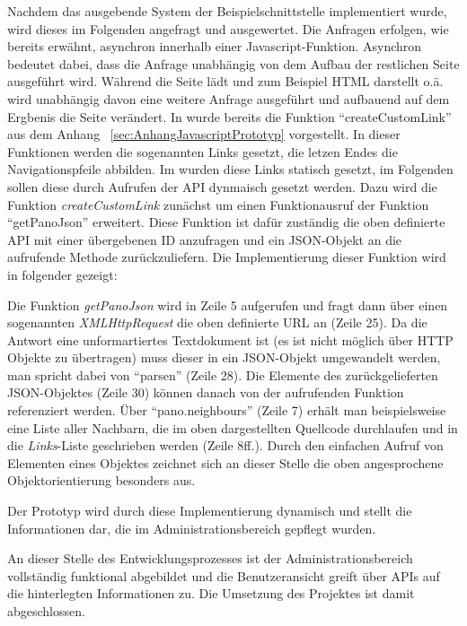 Nachdem das ausgebende System der Beispielschnittstelle implementiert wurde, wird dieses im Folgenden angefragt und ausgewertet. Die Anfragen erfolgen, wie bereits erwähnt, asynchron innerhalb einer Javascript-Funktion. Asynchron bedeutet dabei, dass die Anfrage unabhängig von dem Aufbau der restlichen Seite ausgeführt wird. Während die Seite lädt und zum Beispiel HTML darstellt o.ä. wird unabhängig davon eine weitere Anfrage ausgeführt und aufbauend auf dem Ergbenis die Seite verändert.
In  wurde bereits die Funktion "`createCustomLink"' aus dem Anhang ~\ref{sec:AnhangJavascriptPrototyp} vorgestellt. In dieser Funktionen werden die sogenannten Links gesetzt, die letzen Endes die Navigationspfeile abbilden. Im  wurden diese Links statisch gesetzt, im Folgenden sollen diese durch Aufrufen der API dynmaisch gesetzt werden. Dazu wird die Funktion \textit{createCustomLink} zunächst um einen Funktionausruf der Funktion "`getPanoJson"' erweitert. Diese Funktion ist dafür zuständig die oben definierte API mit einer übergebenen ID anzufragen und ein JSON-Objekt an die aufrufende Methode zurückzuliefern. Die Implementierung dieser Funktion wird in folgender  gezeigt:



Die Funktion \textit{getPanoJson} wird in Zeile 5 aufgerufen und fragt dann über einen sogenannten \textit{XMLHttpRequest} die oben definierte URL an (Zeile 25). Da die Antwort eine unformartiertes Textdokument ist (es ist nicht möglich über HTTP Objekte zu übertragen) muss dieser in ein JSON-Objekt umgewandelt werden, man spricht dabei von "`parsen"' (Zeile 28). Die Elemente des zurückgelieferten JSON-Objektes (Zeile 30) können danach von der aufrufenden Funktion referenziert werden. Über "`pano.neighbours"' (Zeile 7) erhält man beispielsweise eine Liste aller Nachbarn, die im oben dargestellten Quellcode durchlaufen und in die \textit{Links}-Liste geschrieben werden (Zeile 8ff.). Durch den einfachen Aufruf von Elementen eines Objektes zeichnet sich an dieser Stelle die oben angesprochene Objektorientierung besonders aus.

Der Prototyp wird durch diese Implementierung dynamisch und stellt die Informationen dar, die im Administrationsbereich
gepflegt wurden.

An dieser Stelle des Entwicklungsprozesses ist der Administrationsbereich vollständig funktional abgebildet und die Benutzeransicht greift über APIs auf die hinterlegten Informationen zu. Die Umsetzung des Projektes ist damit abgeschlossen.